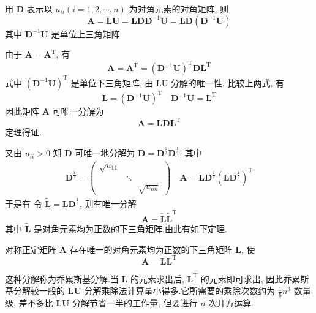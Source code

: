用 $ \boldsymbol{D} $ 表示以 $ u_{i i}(i=1,2, \cdots, n) $ 为对角元素的对角矩阵, 则
$$
\boldsymbol{A}=\boldsymbol{L} \boldsymbol{U}=\boldsymbol{L} \boldsymbol{D} \boldsymbol{D}^{-1} \boldsymbol{U}=\boldsymbol{L} \boldsymbol{D}\left(\boldsymbol{D}^{-1} \boldsymbol{U}\right)
$$
其中 $ \boldsymbol{D}^{-1} \boldsymbol{U} $ 是单位上三角矩阵.

由于 $ \boldsymbol{A}=\boldsymbol{A}^{\mathrm{T}} $, 有
$$
\boldsymbol{A}=\boldsymbol{A}^{\mathrm{T}}=\left(\boldsymbol{D}^{-1} \boldsymbol{U}\right)^{\mathrm{T}} \boldsymbol{D} \boldsymbol{L}^{\mathrm{T}}
$$
式中 $ \left(\boldsymbol{D}^{-1} \boldsymbol{U}\right)^{\mathrm{T}} $ 是单位下三角矩阵, 由 $ \mathrm{LU} $ 分解的唯一性, 比较上两式, 有
$$
\boldsymbol{L}=\left(\boldsymbol{D}^{-1} \boldsymbol{U}\right)^{\mathrm{T}} \quad 
\boldsymbol{D}^{-1} \boldsymbol{U}=\boldsymbol{L}^{\mathrm{T}}
$$
因此矩阵 $ \boldsymbol{A} $ 可唯一分解为
$$
\boldsymbol{A}=\boldsymbol{L} \boldsymbol{D L ^ { \mathrm { T } }}
$$
定理得证.

又由 $ u_{i i}>0 $ 知 $ \boldsymbol{D} $ 可唯一地分解为 $ \boldsymbol{D}=\boldsymbol{D}^{\frac{1}{2}} \boldsymbol{D}^{\frac{1}{2}} $, 其中
$$
\begin{array}{c}
\boldsymbol{D}^{\frac{1}{2}}=\left(\begin{array}{ccc}
\sqrt{u_{11}} & & \\
& \ddots & \\
& & \sqrt{u_{n n}}
\end{array}\right) \quad \boldsymbol{A}=\boldsymbol{L} \boldsymbol{D}^{\frac{1}{2}}\left(\boldsymbol{L} \boldsymbol{D}^{\frac{1}{2}}\right)^{\mathrm{T}}
\end{array}
$$
于是有
令 $ \widetilde{\boldsymbol{L}}=\boldsymbol{L} \boldsymbol{D}^{\frac{1}{2}} $, 则有唯一分解
$$
\boldsymbol{A}=\widetilde{\boldsymbol{L}} \widetilde{\boldsymbol{L}}^{\mathrm{T}}
$$
其中 $ \widetilde{\boldsymbol{L}} $ 是对角元素均为正数的下三角矩阵.由此有如下定理.

\begin{tcolorbox}[enhanced,colback=2,colframe=1,breakable,coltitle=black,title=定理]
对称正定矩阵 $ \boldsymbol{A} $ 存在唯一的对角元素均为正数的下三角矩阵 $ \boldsymbol{L} $, 使
$$
\boldsymbol{A}=\boldsymbol{LL}^{\mathrm{T}}
$$
\end{tcolorbox}
这种分解称为乔累斯基分解.当 $ \boldsymbol{L} $ 的元素求出后, $ \boldsymbol{L}^{\mathrm{T}} $ 的元素即可求出, 因此乔累斯基分解较一般的 $ \boldsymbol{LU} $ 分解乘除法计算量小得多.它所需要的乘除次数约为 $ \frac{1}{6} n^{3} $ 数量级, 差不多比 $ \boldsymbol{LU} $ 分解节省一半的工作量, 但要进行 $ n $ 次开方运算.

